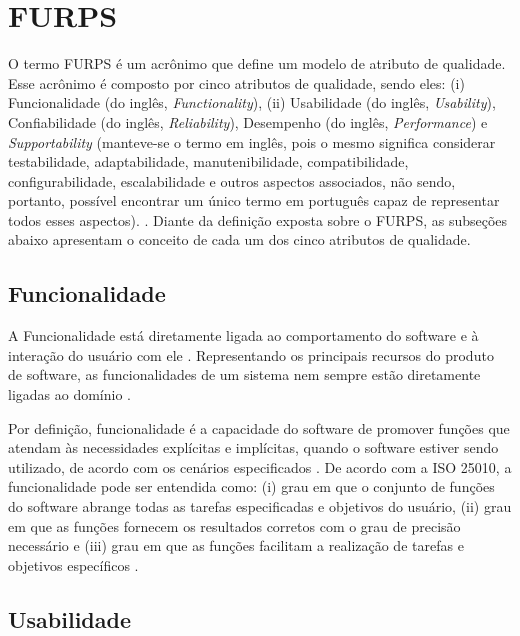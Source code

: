 \section{FURPS}
\label{sec:furps}

O termo FURPS é um acrônimo que define um modelo de atributo de qualidade. Esse acrônimo é composto por cinco atributos de qualidade, sendo eles: (i) Funcionalidade (do inglês, \textit{Functionality}), (ii) Usabilidade (do inglês, \textit{Usability}), Confiabilidade (do inglês, \textit{Reliability}), Desempenho (do inglês, \textit{Performance}) e \textit{Supportability} (manteve-se o termo em inglês, pois o mesmo significa considerar testabilidade, adaptabilidade, manutenibilidade, compatibilidade, configurabilidade, escalabilidade e outros aspectos associados, não sendo, portanto, possível encontrar um único termo em português capaz de representar todos esses aspectos). \cite{umar2011analyzing}. Diante da definição exposta sobre o FURPS, as subseções abaixo apresentam o conceito de cada um dos cinco atributos de qualidade.

\subsection{Funcionalidade}
\label{subsec:funcionalidade}

A Funcionalidade está diretamente ligada ao comportamento do software e à interação do usuário com ele \cite{cintra2006implementaccao}. Representando os principais recursos do produto de software, as funcionalidades de um sistema nem sempre estão diretamente ligadas ao domínio \cite{pressman2011engenharia}. 

Por definição, funcionalidade é a capacidade do software de promover funções que atendam às necessidades explícitas e implícitas, quando o software estiver sendo utilizado, de acordo com os cenários especificados \cite{qualidadeDeProdutoNBR}. De acordo com a ISO 25010, a funcionalidade pode ser entendida como: (i) grau em que o conjunto de funções do software abrange todas as tarefas especificadas e objetivos do usuário, (ii) grau em que as funções fornecem os resultados corretos com o grau de precisão necessário e (iii) grau em que as funções facilitam a realização de tarefas e objetivos específicos \cite{gordieiev2014evolution}.


\subsection{Usabilidade}
\label{subsec:usabilidade}

